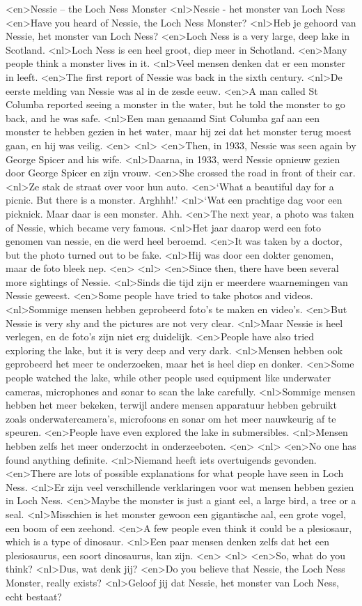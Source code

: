 <en>Nessie – the Loch Ness Monster 
<nl>Nessie - het monster van Loch Ness
<en>Have you heard of Nessie, the Loch Ness Monster? 
<nl>Heb je gehoord van Nessie, het monster van Loch Ness? 
<en>Loch Ness is a very large, deep lake in Scotland.
<nl>Loch Ness is een heel groot, diep meer in Schotland.
<en>Many people think a monster lives in it.
<nl>Veel mensen denken dat er een monster in leeft.
<en>The first report of Nessie was back in the sixth century. 
<nl>De eerste melding van Nessie was al in de zesde eeuw.
<en>A man called St Columba reported seeing a monster in the water, but he told the monster to go back, and he was safe.
<nl>Een man genaamd Sint Columba gaf aan een monster te hebben gezien in het water, maar hij zei dat het monster terug moest gaan, en hij was veilig.
<en>
<nl>
<en>Then, in 1933, Nessie was seen again by George Spicer and his wife.
<nl>Daarna, in 1933, werd Nessie opnieuw gezien door George Spicer en zijn vrouw.
<en>She crossed the road in front of their car.
<nl>Ze stak de straat over voor hun auto.
<en>‘What a beautiful day for a picnic. But there is a monster. Arghhh!.'
<nl>`Wat een prachtige dag voor een picknick. Maar daar is een monster. Ahh.
<en>The next year, a photo was taken of Nessie, which became very famous. 
<nl>Het jaar daarop werd een foto genomen van nessie, en die werd heel beroemd.
<en>It was taken by a doctor, but the photo turned out to be fake.
<nl>Hij was door een dokter genomen, maar de foto bleek nep.
<en>
<nl>
<en>Since then, there have been several more sightings of Nessie. 
<nl>Sinds die tijd zijn er meerdere waarnemingen van Nessie geweest. 
<en>Some people have tried to take photos and videos.
<nl>Sommige mensen hebben geprobeerd foto's te maken en video's.
<en>But Nessie is very shy and the pictures are not very clear.
<nl>Maar Nessie is heel verlegen, en de foto's zijn niet erg duidelijk.
<en>People have also tried exploring the lake, but it is very deep and very dark. 
<nl>Mensen hebben ook geprobeerd het meer te onderzoeken, maar het is heel diep en donker.
<en>Some people watched the lake, while other people used equipment like underwater cameras, microphones and sonar to scan the lake carefully.
<nl>Sommige mensen hebben het meer bekeken, terwijl andere mensen apparatuur hebben gebruikt zoals onderwatercamera's, microfoons en sonar om het meer nauwkeurig af te speuren.
<en>People have even explored the lake in submersibles. 
<nl>Mensen hebben zelfs het meer onderzocht in onderzeeboten.
<en>
<nl>
<en>No one has found anything definite. 
<nl>Niemand heeft iets overtuigends gevonden.
<en>There are lots of possible explanations for what people have seen in Loch Ness. 
<nl>Er zijn veel verschillende verklaringen voor wat mensen hebben gezien in Loch Ness. 
<en>Maybe the monster is just a giant eel, a large bird, a tree or a seal. 
<nl>Misschien is het monster gewoon een gigantische aal, een grote vogel, een boom of een zeehond. 
<en>A few people even think it could be a plesiosaur, which is a type of dinosaur.
<nl>Een paar mensen denken zelfs dat het een plesiosaurus, een soort dinosaurus, kan zijn.
<en>
<nl>
<en>So, what do you think? 
<nl>Dus, wat denk jij? 
<en>Do you believe that Nessie, the Loch Ness Monster, really exists?
<nl>Geloof jij dat Nessie, het monster van Loch Ness, echt bestaat?
